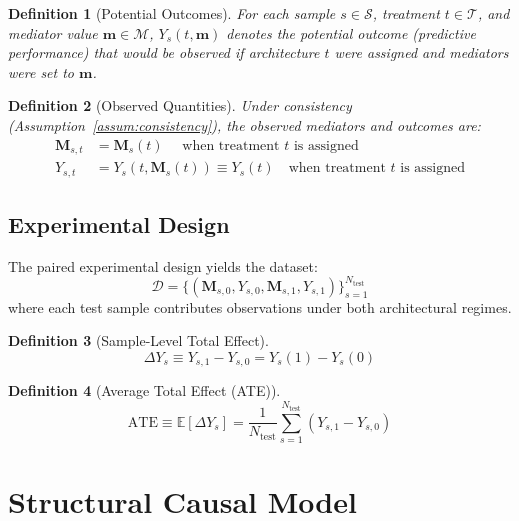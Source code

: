 \documentclass[
    reprint,
    amsmath, amssymb,
    aps,
    floatfix,
    nofootinbib
]{revtex4-1}
\newtheorem{definition}{Definition}
\begin{document}
\begin{definition}[Potential Outcomes]
For each sample $s \in \mathcal{S}$, treatment $t \in \mathcal{T}$, and mediator value $\bm{m} \in \mathcal{M}$, $Y_s(t, \bm{m})$ denotes the potential outcome (predictive performance) that would be observed if architecture $t$ were assigned and mediators were set to $\bm{m}$.
\end{definition}

\begin{definition}[Observed Quantities]
Under consistency (Assumption~\ref{assum:consistency}), the observed mediators and outcomes are:
\begin{align}
    \bm{M}_{s,t} &= \bm{M}_s(t) \quad \text{ when treatment } t \text{ is assigned} \\
    Y_{s,t} &= Y_s(t, \bm{M}_s(t)) \equiv Y_s(t) \quad \text{when treatment } t \text{ is assigned}
\end{align}
\end{definition}

\subsection{Experimental Design}
The paired experimental design yields the dataset:
\begin{equation}
    \mathcal{D} = \{(\bm{M}_{s,0}, Y_{s,0}, \bm{M}_{s,1}, Y_{s,1})\}_{s=1}^{N_{\text{test}}}
\end{equation}
where each test sample contributes observations under both architectural regimes.

\begin{definition}[Sample-Level Total Effect]
\begin{equation}
   \Delta Y_s \equiv Y_{s,1} - Y_{s,0} = Y_s(1) - Y_s(0) 
\end{equation}

\end{definition}

\begin{definition}[Average Total Effect (ATE)]
\begin{equation}
    \text{ATE} \equiv \mathbb{E}[\Delta Y_s] = \frac{1}{N_{\text{test}}} \sum_{s=1}^{N_{\text{test}}} (Y_{s,1} - Y_{s,0})
\end{equation}
\end{definition}

\section{Structural Causal Model}
\end{document}

